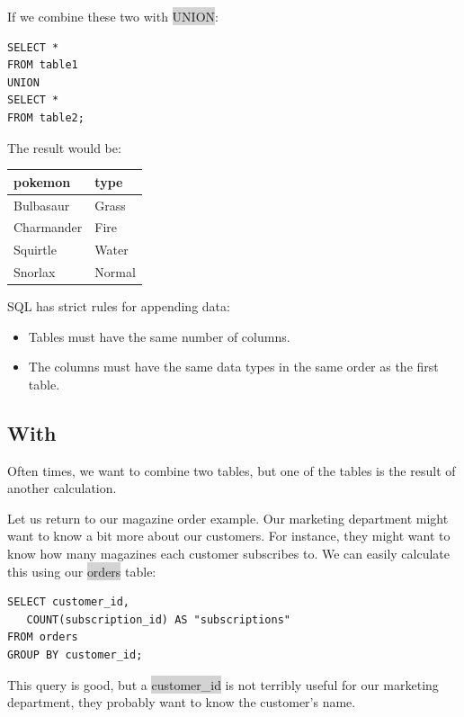 \documentclass[11pt]{article}
\begin{document}
{{{{{{If we combine these two with \colorbox{lightgray}{UNION}:
\begin{lstlisting}
SELECT *
FROM table1
UNION
SELECT *
FROM table2;
\end{lstlisting}
The result would be:

{
\begin{tabular}{ | m{20em} | m{20em} |}
\hline
\textbf{pokemon} & \textbf{type} \\ 
\hline
Bulbasaur & Grass \\ 
\hline
Charmander & Fire \\
\hline
Squirtle & Water \\ 
\hline
Snorlax & Normal \\
\hline
\end{tabular}

SQL has strict rules for appending data:
\begin{itemize}[leftmargin = *]
\item Tables must have the same number of columns.
\item The columns must have the same data types in the same order as the first table.
\end{itemize}

\subsection{With}
Often times, we want to combine two tables, but one of the tables is the result of another calculation.

Let us return to our magazine order example. Our marketing department might want to know a bit more about our customers. For instance, they might want to know how many magazines each customer subscribes to. We can easily calculate this using our \colorbox{lightgray}{orders} table:
\begin{lstlisting}
SELECT customer_id,
   COUNT(subscription_id) AS "subscriptions"
FROM orders
GROUP BY customer_id;
\end{lstlisting}
This query is good, but a \colorbox{lightgray}{customer\_id} is not terribly useful for our marketing department, they probably want to know the customer's name.

}}}}}}}
\end{document}
